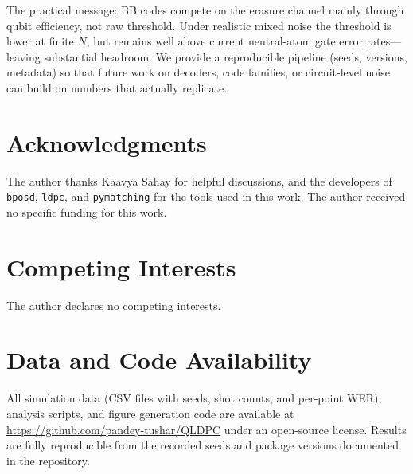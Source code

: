 \documentclass[a4paper]{quantumarticle}
\begin{document}
The practical message: BB codes compete on the erasure channel mainly through qubit
efficiency, not raw threshold.
Under realistic mixed noise the threshold is lower at finite $N$, but remains well above
current neutral-atom gate error rates---leaving substantial headroom.
We provide a reproducible pipeline (seeds, versions, metadata) so that future work on
decoders, code families, or circuit-level noise can build on numbers that actually replicate.

\section*{Acknowledgments}

The author thanks Kaavya Sahay for helpful discussions, and the developers of \texttt{bposd}, \texttt{ldpc}, and \texttt{pymatching}
for the tools used in this work.
The author received no specific funding for this work.

\section*{Competing Interests}

The author declares no competing interests.

\section*{Data and Code Availability}

All simulation data (CSV files with seeds, shot counts, and per-point WER), analysis scripts,
and figure generation code are available at \url{https://github.com/pandey-tushar/QLDPC}
under an open-source license.
Results are fully reproducible from the recorded seeds and package versions documented in
the repository.



\end{document}
